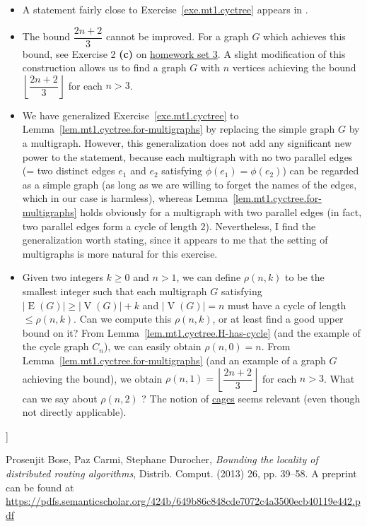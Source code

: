 \documentclass[numbers=enddot,12pt,final,onecolumn,notitlepage]{scrartcl}%
\newcounter{exer}
\theoremstyle{definition}
\newcommand{\abs}[1]{\left| #1 \right|}
\newcommand{\tup}[1]{\left( #1 \right)}
\newcommand{\floor}[1]{\left\lfloor #1 \right\rfloor}
\newcommand{\verts}[1]{\operatorname{V}\left( #1 \right)}
\newcommand{\edges}[1]{\operatorname{E}\left( #1 \right)}
\begin{document}
\begin{itemize}
\item A statement fairly close to
      Exercise~\ref{exe.mt1.cyctree} appears in
      \cite[Lemma 6]{BoCaDu13}.

\item The bound $\dfrac{2n+2}{3}$ cannot be improved.
      For a graph $G$ which achieves this bound, see
      Exercise 2 \textbf{(c)} on
      \href{http://www.cip.ifi.lmu.de/~grinberg/t/17s/hw3.pdf}{homework set 3}.
      A slight modification of this construction allows us to
      find a graph $G$ with $n$ vertices achieving the bound
      $\floor{\dfrac{2n+2}{3}}$ for each $n > 3$.

\item We have generalized Exercise~\ref{exe.mt1.cyctree} to
      Lemma~\ref{lem.mt1.cyctree.for-multigraphs} by replacing
      the simple graph $G$ by a multigraph. However, this
      generalization does not add any significant new power to
      the statement, because each multigraph with no two
      parallel edges (= two distinct edges $e_1$ and $e_2$
      satisfying $\phi\tup{e_1} = \phi\tup{e_2}$) can be
      regarded as a simple graph (as long as we are willing to
      forget the names of the edges, which in our case is
      harmless), whereas Lemma~\ref{lem.mt1.cyctree.for-multigraphs}
      holds obviously for a multigraph with two parallel edges
      (in fact, two parallel edges form a cycle of length $2$).
      Nevertheless, I find the generalization worth stating,
      since it appears to me that the setting of multigraphs
      is more natural for this exercise.

\item Given two integers $k \geq 0$ and $n > 1$, we can
      define $\rho\tup{n, k}$ to be the smallest integer such
      that each multigraph $G$ satisfying
      $\abs{\edges{G}} \geq \abs{\verts{G}} + k$ and
      $\abs{\verts{G}} = n$ must have a cycle of length
      $\leq \rho\tup{n, k}$. Can we compute this
      $\rho\tup{n, k}$, or at least find a good upper bound on
      it? From Lemma~\ref{lem.mt1.cyctree.H-has-cycle} (and the
      example of the cycle graph $C_n$), we can easily obtain
      $\rho\tup{n, 0} = n$. From
      Lemma~\ref{lem.mt1.cyctree.for-multigraphs} (and an
      example of a graph $G$ achieving the bound), we obtain
      $\rho\tup{n, 1} = \floor{\dfrac{2n+2}{3}}$ for each
      $n > 3$. What can we say about $\rho\tup{n, 2}$ ?
      The notion of
      \href{http://www.win.tue.nl/~aeb/drg/graphs/cages/cages.html}{cages}
      seems relevant (even though not directly applicable).
\end{itemize}
]

\begin{thebibliography}{999999}
Prosenjit Bose, Paz Carmi, Stephane Durocher,
\textit{Bounding the locality of distributed routing
algorithms},
Distrib. Comput. (2013) 26, pp. 39--58.
\newline A preprint can be found at
\url{https://pdfs.semanticscholar.org/424b/649b86c848cde7072c4a3500ecb40119e442.pdf}
\end{thebibliography}
\end{document}
